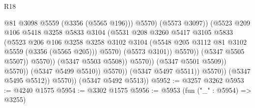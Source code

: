 \begin{lexlean}{R18}
\begin{coremodule}
                                                  @81
                                                  @3098
                                                  @5559
                                                  (@3356 (@5565 @196)))
                                                @5570)
                                              (@5573 @3097))
                                            (@5523
                                              @209
                                              @106
                                              @5418
                                              @3258
                                              @5833
                                              @3104
                                              (@5531
                                                @208
                                                @3260
                                                @5417
                                                @3105
                                                @5833
                                                (@5523
                                                  @206
                                                  @106
                                                  @3258
                                                  @3258
                                                  @3102
                                                  @3104
                                                  (@5548
                                                    @205
                                                    @3112
                                                    @81
                                                    @3102
                                                    @5559
                                                    (@3356 (@5565 @205)))
                                                  @5570)
                                                (@5573 @3101))
                                              @5570))
                                          (@5347 @5505 @5507))
                                        @5570))
                                    (@5347 @5503 @5508))
                                  @5570))
                              (@5347 @5501 @5509))
                            @5570))
                        (@5347 @5499 @5510))
                      @5570))
                  (@5347 @5497 @5511))
                @5570))
            (@5347 @5495 @5512))
          @5570))
      (@5347 @5492 @5513))
@5952 := @3257 @3262
@5953 := @4240 @1575
@5954 := @3302 @1575
@5956 := @5953 (fun ("_" : @5954) => @3255)

\end{coremodule}
\end{lexlean}
